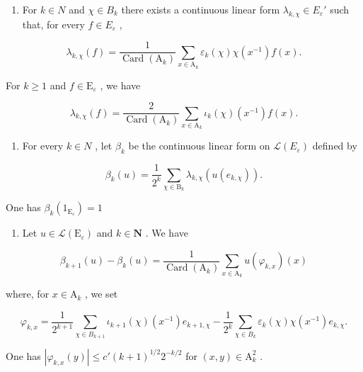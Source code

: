 \begin{enumerate}
\def\labelenumi{\alph{enumi})}
\setcounter{enumi}{2}
\tightlist
\item
  For \(k \in N\) and \(\chi \in B_{k}\) there exists a continuous linear form \(\lambda_{k,\chi} \in E_{\varepsilon}'\) such that, for every \(f \in E_{\varepsilon}\) ,
\end{enumerate}

\[
\lambda_ {k, \chi} (f) = \frac {1}{\operatorname{Card} (\mathrm{A} _ {k})} \sum_ {x \in \mathrm{A} _ {k}} \varepsilon_ {k} (\chi) \chi (x ^ {- 1}) f (x).
\]

For \(k \geqslant 1\) and \(f \in \mathrm{E}_{\varepsilon}\) , we have

\[
\lambda_ {k, \chi} (f) = \frac {2}{\operatorname{Card} (\mathrm{A} _ {k})} \sum_ {x \in \mathrm{A} _ {k}} \iota_ {k} (\chi) (x ^ {- 1}) f (x).
\]

\begin{enumerate}
\def\labelenumi{\alph{enumi})}
\setcounter{enumi}{3}
\tightlist
\item
  For every \(k \in N\) , let \(\beta_{k}\) be the continuous linear form on \(\mathcal{L}(E_{\varepsilon})\) defined by
\end{enumerate}

\[
\beta_ {k} (u) = \frac {1}{2 ^ {k}} \sum_ {\chi \in \mathrm{B} _ {k}} \lambda_ {k, \chi} (u (e _ {k, \chi})).
\]

One has \(\beta_{k}(1_{\mathrm{E}_{\varepsilon}}) = 1\)

\begin{enumerate}
\def\labelenumi{\alph{enumi})}
\setcounter{enumi}{4}
\tightlist
\item
  Let \(u \in \mathcal{L}(\mathrm{E}_{\varepsilon})\) and \(k \in \mathbf{N}\) . We have
\end{enumerate}

\[
\beta_ {k + 1} (u) - \beta_ {k} (u) = \frac {1}{\operatorname{Card} \left(\mathrm{A} _ {k}\right)} \sum_ {x \in \mathrm{A} _ {k}} u \left(\varphi_ {k, x}\right) (x)
\]

where, for \(x \in \mathrm{A}_k\) , we set

\[
\varphi_ {k, x} = \frac {1}{2 ^ {k + 1}} \sum_ {\chi \in B _ {k + 1}} \iota_ {k + 1} (\chi) (x ^ {- 1}) e _ {k + 1, \chi} - \frac {1}{2 ^ {k}} \sum_ {\chi \in B _ {k}} \varepsilon_ {k} (\chi) \chi (x ^ {- 1}) e _ {k, \chi}.
\]

One has \(|\varphi_{k,x}(y)| \leqslant c'(k + 1)^{1/2}2^{-k/2}\) for \((x,y) \in \mathrm{A}_k^2\) .


